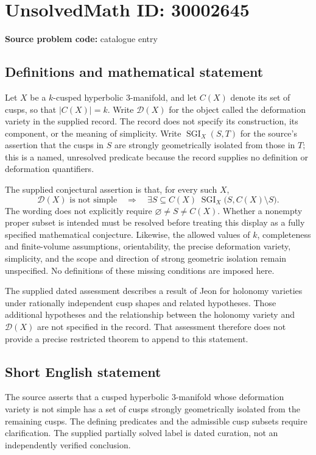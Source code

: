 \documentclass[11pt]{article}
\begin{document}
\section*{UnsolvedMath ID: 30002645}
\textbf{Source problem code:} catalogue entry
\subsection{Definitions and mathematical statement}
Let \(X\) be a \(k\)-cusped hyperbolic \(3\)-manifold, and let \(C(X)\) denote its set of cusps, so that \(|C(X)|=k\). Write \(\mathcal D(X)\) for the object called the deformation variety in the supplied record. The record does not specify its construction, its component, or the meaning of simplicity. Write \(\operatorname{SGI}_X(S,T)\) for the source's assertion that the cusps in \(S\) are strongly geometrically isolated from those in \(T\); this is a named, unresolved predicate because the record supplies no definition or deformation quantifiers.

The supplied conjectural assertion is that, for every such \(X\),
\[
\mathcal D(X)\text{ is not simple}
\quad\Longrightarrow\quad
\exists S\subseteq C(X)\;\operatorname{SGI}_X\bigl(S,C(X)\setminus S\bigr).
\]
The wording does not explicitly require \(\varnothing\ne S\ne C(X)\). Whether a nonempty proper subset is intended must be resolved before treating this display as a fully specified mathematical conjecture. Likewise, the allowed values of \(k\), completeness and finite-volume assumptions, orientability, the precise deformation variety, simplicity, and the scope and direction of strong geometric isolation remain unspecified. No definitions of these missing conditions are imposed here.

The supplied dated assessment describes a result of Jeon for holonomy varieties under rationally independent cusp shapes and related hypotheses. Those additional hypotheses and the relationship between the holonomy variety and \(\mathcal D(X)\) are not specified in the record. That assessment therefore does not provide a precise restricted theorem to append to this statement.
\subsection{Short English statement}
The source asserts that a cusped hyperbolic \(3\)-manifold whose deformation variety is not simple has a set of cusps strongly geometrically isolated from the remaining cusps. The defining predicates and the admissible cusp subsets require clarification. The supplied partially solved label is dated curation, not an independently verified conclusion.
\end{document}
